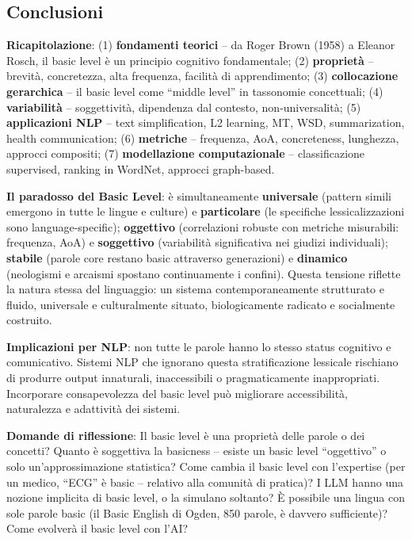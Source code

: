 \documentclass[12pt,a4paper]{article}
\begin{document}
\subsection{Conclusioni}

\textbf{Ricapitolazione}: (1) \textbf{fondamenti teorici} -- da Roger Brown (1958) a Eleanor Rosch, il basic level \`e un principio cognitivo fondamentale; (2) \textbf{propriet\`a} -- brevit\`a, concretezza, alta frequenza, facilit\`a di apprendimento; (3) \textbf{collocazione gerarchica} -- il basic level come ``middle level'' in tassonomie concettuali; (4) \textbf{variabilit\`a} -- soggettivit\`a, dipendenza dal contesto, non-universalit\`a; (5) \textbf{applicazioni NLP} -- text simplification, L2 learning, MT, WSD, summarization, health communication; (6) \textbf{metriche} -- frequenza, AoA, concreteness, lunghezza, approcci compositi; (7) \textbf{modellazione computazionale} -- classificazione supervised, ranking in WordNet, approcci graph-based.

\begin{quizbox}
\textbf{Il paradosso del Basic Level}: \`e simultaneamente \textbf{universale} (pattern simili emergono in tutte le lingue e culture) e \textbf{particolare} (le specifiche lessicalizzazioni sono language-specific); \textbf{oggettivo} (correlazioni robuste con metriche misurabili: frequenza, AoA) e \textbf{soggettivo} (variabilit\`a significativa nei giudizi individuali); \textbf{stabile} (parole core restano basic attraverso generazioni) e \textbf{dinamico} (neologismi e arcaismi spostano continuamente i confini). Questa tensione riflette la natura stessa del linguaggio: un sistema contemporaneamente strutturato e fluido, universale e culturalmente situato, biologicamente radicato e socialmente costruito.
\end{quizbox}

\textbf{Implicazioni per NLP}: non tutte le parole hanno lo stesso status cognitivo e comunicativo. Sistemi NLP che ignorano questa stratificazione lessicale rischiano di produrre output innaturali, inaccessibili o pragmaticamente inappropriati. Incorporare consapevolezza del basic level pu\`o migliorare accessibilit\`a, naturalezza e adattivit\`a dei sistemi.

\textbf{Domande di riflessione}: Il basic level \`e una propriet\`a delle parole o dei concetti? Quanto \`e soggettiva la basicness -- esiste un basic level ``oggettivo'' o solo un'approssimazione statistica? Come cambia il basic level con l'expertise (per un medico, ``ECG'' \`e basic -- relativo alla comunit\`a di pratica)? I LLM hanno una nozione implicita di basic level, o la simulano soltanto? \`E possibile una lingua con sole parole basic (il Basic English di Ogden, 850 parole, \`e davvero sufficiente)? Come evolver\`a il basic level con l'AI?
\end{document}
